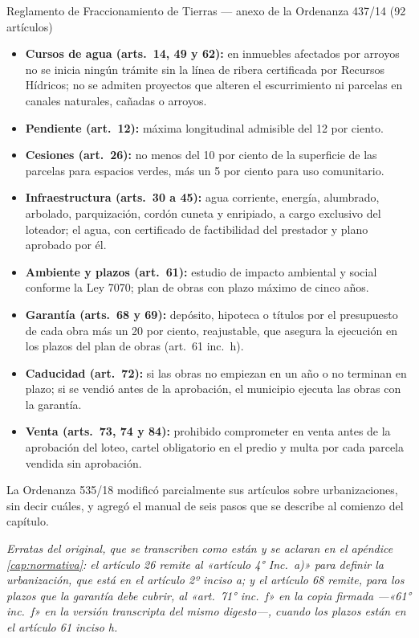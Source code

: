 \begin{ficha}{Reglamento de Fraccionamiento de Tierras --- anexo de la Ordenanza 437/14 (92 artículos)}
\begin{itemize}[leftmargin=*,nosep]
\item \textbf{Cursos de agua (arts.\ 14, 49 y 62):} en inmuebles afectados por arroyos no se inicia ningún trámite sin la línea de ribera certificada por Recursos Hídricos; no se admiten proyectos que alteren el escurrimiento ni parcelas en canales naturales, cañadas o arroyos.
\item \textbf{Pendiente (art.\ 12):} máxima longitudinal admisible del 12 por ciento.
\item \textbf{Cesiones (art.\ 26):} no menos del 10 por ciento de la superficie de las parcelas para espacios verdes, más un 5 por ciento para uso comunitario.
\item \textbf{Infraestructura (arts.\ 30 a 45):} agua corriente, energía, alumbrado, arbolado, parquización, cordón cuneta y enripiado, a cargo exclusivo del loteador; el agua, con certificado de factibilidad del prestador y plano aprobado por él.
\item \textbf{Ambiente y plazos (art.\ 61):} estudio de impacto ambiental y social conforme la Ley 7070; plan de obras con plazo máximo de cinco años.
\item \textbf{Garantía (arts.\ 68 y 69):} depósito, hipoteca o títulos por el presupuesto de cada obra más un 20 por ciento, reajustable, que asegura la ejecución en los plazos del plan de obras (art.\ 61 inc.\ h).
\item \textbf{Caducidad (art.\ 72):} si las obras no empiezan en un año o no terminan en plazo; si se vendió antes de la aprobación, el municipio ejecuta las obras con la garantía.
\item \textbf{Venta (arts.\ 73, 74 y 84):} prohibido comprometer en venta antes de la aprobación del loteo, cartel obligatorio en el predio y multa por cada parcela vendida sin aprobación.
\end{itemize}
La Ordenanza 535/18 modificó parcialmente sus artículos sobre urbanizaciones, sin decir cuáles, y agregó el manual de seis pasos que se describe al comienzo del capítulo.

\textit{Erratas del original, que se transcriben como están y se aclaran en el apéndice \ref{cap:normativa}: el artículo 26 remite al «artículo 4° Inc.\ a)» para definir la urbanización, que está en el artículo 2º inciso a; y el artículo 68 remite, para los plazos que la garantía debe cubrir, al «art.\ 71° inc.\ f» en la copia firmada ---«61° inc.\ f» en la versión transcripta del mismo digesto---, cuando los plazos están en el artículo 61 inciso h.}
\end{ficha}

